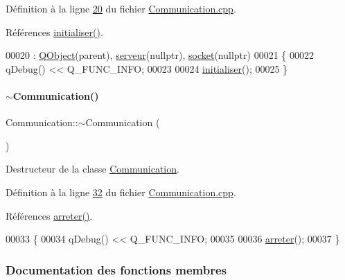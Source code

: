 Définition à la ligne \hyperlink{_communication_8cpp_source_l00020}{20} du fichier \hyperlink{_communication_8cpp_source}{Communication.\+cpp}.



Références \hyperlink{_communication_8cpp_source_l00044}{initialiser()}.


\begin{DoxyCode}
00020                                             : \hyperlink{class_q_object}{QObject}(parent), \hyperlink{class_communication_a6384747297d6efa9e8fd2fc79ed0c269}{serveur}(\textcolor{keyword}{nullptr}), 
      \hyperlink{class_communication_aa4ddc3151b305db0135d5826384645cc}{socket}(\textcolor{keyword}{nullptr})
00021 \{
00022     qDebug() << Q\_FUNC\_INFO;
00023 
00024     \hyperlink{class_communication_a2c10a52807bc7bdc520ec3fae622f672}{initialiser}();
00025 \}
\end{DoxyCode}
\mbox{\label{class_communication_a75ba08ce908d45251e28e4c1db94e6f4}} 
\paragraph{\texorpdfstring{$\sim$\+Communication()}{~Communication()}}
{\footnotesize\ttfamily Communication\+::$\sim$\+Communication (\begin{DoxyParamCaption}{ }\end{DoxyParamCaption})}



Destructeur de la classe \hyperlink{class_communication}{Communication}. 



Définition à la ligne \hyperlink{_communication_8cpp_source_l00032}{32} du fichier \hyperlink{_communication_8cpp_source}{Communication.\+cpp}.



Références \hyperlink{_communication_8cpp_source_l00099}{arreter()}.


\begin{DoxyCode}
00033 \{
00034     qDebug() << Q\_FUNC\_INFO;
00035 
00036     \hyperlink{class_communication_a1f4b02441803f9c8e231cb9f304d776b}{arreter}();
00037 \}
\end{DoxyCode}


\subsubsection{Documentation des fonctions membres}
\mbox{\label{class_communication_a1f4b02441803f9c8e231cb9f304d776b}} 
